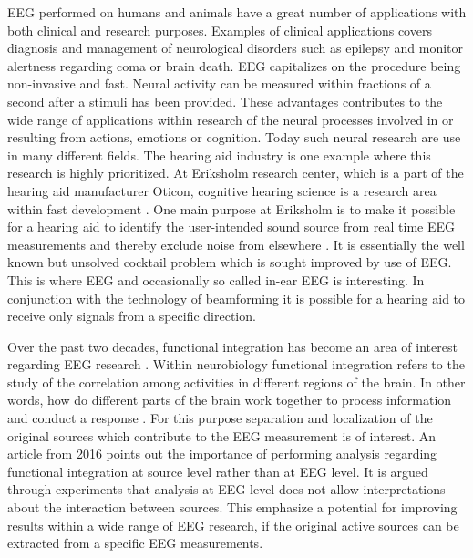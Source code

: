 EEG performed on humans and animals have a great number of applications with both clinical and research purposes. 
Examples of clinical applications covers diagnosis and management of neurological disorders such as epilepsy and monitor alertness regarding coma or brain death.
EEG capitalizes on the procedure being non-invasive and fast.
Neural activity can be measured within fractions of a second after a stimuli has been provided. 
These advantages contributes to the wide range of applications within research of the neural processes involved in or resulting from actions, emotions or  cognition. Today such neural research are use in many different fields\cite[p. 4]{fundamentalEEG}.
The hearing aid industry is one example where this research is highly prioritized. 
At Eriksholm research center, which is a part of the hearing aid manufacturer Oticon, cognitive hearing science is a research area within fast development \cite{Weberik}. 
One main purpose at Eriksholm is to make it possible for a hearing aid to identify the user-intended sound source from real time EEG measurements and thereby exclude noise from elsewhere \cite{Emina2019} \cite{Bech2018}. 
It is essentially the well known but unsolved cocktail problem which is sought improved by use of EEG. 
This is where EEG and occasionally so called in-ear EEG is interesting. In conjunction with the technology of beamforming it is possible for a hearing aid to receive only signals from a specific direction. 

Over the past two decades, functional integration has become an area of interest regarding EEG research \cite{Friston2011}. 
Within neurobiology functional integration refers to the study of the correlation among activities in different regions of the brain. 
In other words, how do different parts of the brain work together to process information and conduct a response \cite{Friston2002}.     
For this purpose separation and localization of the original sources which contribute to the EEG measurement is of interest. 
An article from 2016 \cite{Van2019} points out the importance of performing analysis regarding functional integration at source level rather than at EEG level. 
It is argued through experiments that analysis at EEG level does not allow interpretations about the interaction between sources. 
This emphasize a potential for improving results within a wide range of EEG research, if the original active sources can be extracted from a specific EEG measurements.    

